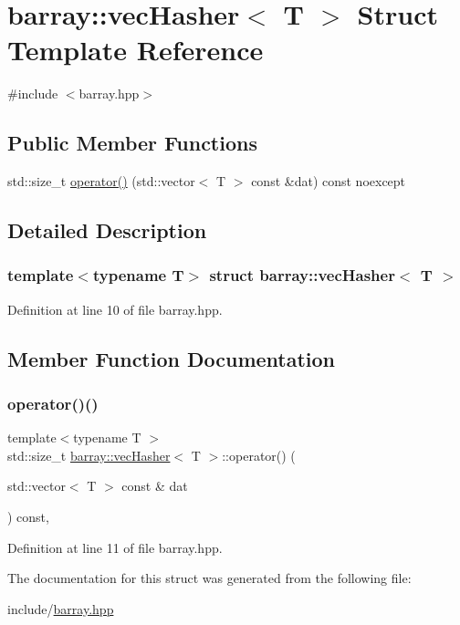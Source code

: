 \hypertarget{structbarray_1_1vec_hasher}{}\section{barray\+:\+:vec\+Hasher$<$ T $>$ Struct Template Reference}
\label{structbarray_1_1vec_hasher}


{\ttfamily \#include $<$barray.\+hpp$>$}

\subsection*{Public Member Functions}
\begin{DoxyCompactItemize}
\item 
std\+::size\+\_\+t \hyperlink{structbarray_1_1vec_hasher_afc3333b0c3e663d26de5851fe631e960}{operator()} (std\+::vector$<$ T $>$ const \&dat) const noexcept
\end{DoxyCompactItemize}


\subsection{Detailed Description}
\subsubsection*{template$<$typename T$>$\newline
struct barray\+::vec\+Hasher$<$ T $>$}



Definition at line 10 of file barray.\+hpp.



\subsection{Member Function Documentation}
\mbox{\label{structbarray_1_1vec_hasher_afc3333b0c3e663d26de5851fe631e960}} 
\subsubsection{\texorpdfstring{operator()()}{operator()()}}
{\footnotesize\ttfamily template$<$typename T $>$ \\
std\+::size\+\_\+t \hyperlink{structbarray_1_1vec_hasher}{barray\+::vec\+Hasher}$<$ T $>$\+::operator() (\begin{DoxyParamCaption}\item[{std\+::vector$<$ T $>$ const \&}]{dat }\end{DoxyParamCaption}) const\hspace{0.3cm}{\ttfamily [inline]}, {\ttfamily [noexcept]}}



Definition at line 11 of file barray.\+hpp.



The documentation for this struct was generated from the following file\+:\begin{DoxyCompactItemize}
\item 
include/\hyperlink{barray_8hpp}{barray.\+hpp}\end{DoxyCompactItemize}

